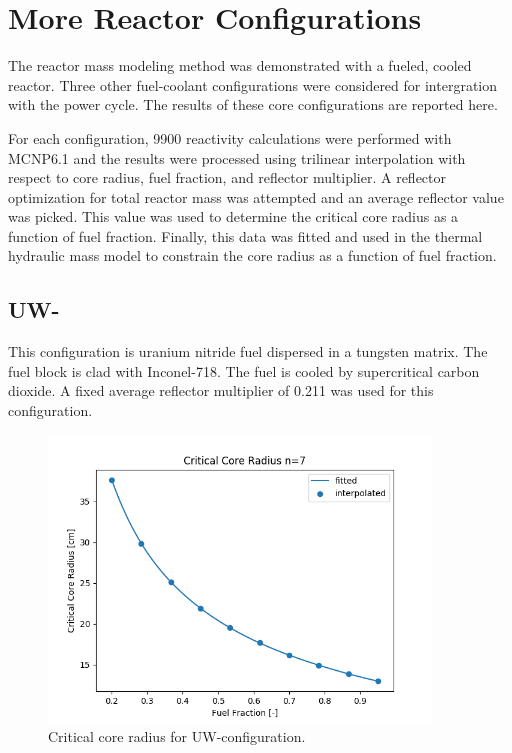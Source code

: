 \chapter{More Reactor Configurations}\label{ch:appendix-a}

The reactor mass modeling method was demonstrated with a \uox fueled, \codiox
cooled reactor. Three other fuel-coolant configurations were considered for
intergration with the power cycle. The results of these core configurations are
reported here.

For each configuration, 9900 reactivity calculations were performed with
MCNP6.1 and the \keff results were processed using trilinear interpolation with
respect to core radius, fuel fraction, and reflector multiplier. A reflector
optimization for total reactor mass was attempted and an average reflector value
was picked. This value was used to determine the critical core radius as a
function of fuel fraction. Finally, this data was fitted and used in the thermal
hydraulic mass model to constrain the core radius as a function of fuel
fraction.


\section{UW-\codiox}
This configuration is uranium nitride fuel dispersed in a tungsten matrix. The
fuel block is clad with Inconel-718. The
fuel is cooled by supercritical carbon dioxide. A fixed average reflector
multiplier of 0.211 was used for this configuration.

\begin{figure}[h]
    \centering
    \includegraphics[width=4in]{../images/core_r_un_co2.png}
\caption{Critical core radius for UW-\codiox configuration.}
\label{fig:core_r_un_co2}
\end{figure}

